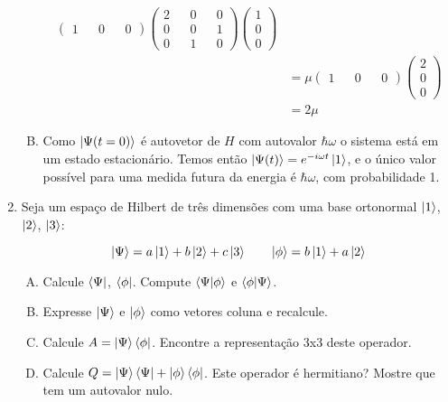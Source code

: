 \documentclass[a4paper, 12pt, notitlepage]{article}
\begin{document}
\begin{enumerate}
\begin{enumerate}[(A)]
\begin{align*}
\begin{pmatrix}
  1 && 0 && 0 \end{pmatrix} \begin{pmatrix}
  2 && 0 && 0 \\
  0 && 0 && 1 \\
  0 && 1 && 0
  \end{pmatrix} \begin{pmatrix} 1 \\ 0 \\ 0 \end{pmatrix} \\
  &= \mu \begin{pmatrix} 1 && 0 && 0 \end{pmatrix} \begin{pmatrix}
  2 \\ 0 \\ 0 \end{pmatrix} \\
  &= 2\mu
  \end{align*}
  
  \item Como $\ket{\Psi(t=0)}$ é autovetor de $H$ com autovalor $\hbar \omega$ o sistema está em um estado estacionário. Temos então $\ket{\Psi(t)} = e^{-i\omega t}\ket{1}$, e o único valor possível para uma medida futura da energia é $\hbar \omega$, com probabilidade 1.
\end{enumerate}

\item Seja um espaço de Hilbert de três dimensões com uma base ortonormal $\ket{1}$, $\ket{2}$, $\ket{3}$:

\begin{equation*}
  \ket{\Psi} = a\ket{1} + b\ket{2} + c\ket{3} \qquad \ket{\phi} = b\ket{1} + a\ket{2}
\end{equation*}

\begin{enumerate}[(A)]
  \item Calcule $\bra{\Psi}$, $\bra{\phi}$. Compute $\bra{\Psi}\ket{\phi}$ e $\bra{\phi}\ket{\Psi}$.
  \item Expresse $\ket{\Psi}$ e $\ket{\phi}$ como vetores coluna e recalcule.
  \item Calcule $A = \ket{\Psi} \bra{\phi}$. Encontre a representação 3x3 deste operador.
  \item Calcule $Q = \ket{\Psi}\bra{\Psi} + \ket{\phi}\bra{\phi}$. Este operador é hermitiano? Mostre que tem um autovalor nulo.
\end{enumerate}


\end{enumerate}
\end{document}
